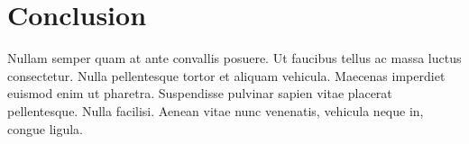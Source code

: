 \documentclass[12pt]{diazessay} %
\begin{document}
\section{Conclusion}

Nullam semper quam at ante convallis posuere. Ut faucibus tellus ac massa luctus consectetur. Nulla pellentesque tortor et aliquam vehicula. Maecenas imperdiet euismod enim ut pharetra. Suspendisse pulvinar sapien vitae placerat pellentesque. Nulla facilisi. Aenean vitae nunc venenatis, vehicula neque in, congue ligula.







\end{document}
